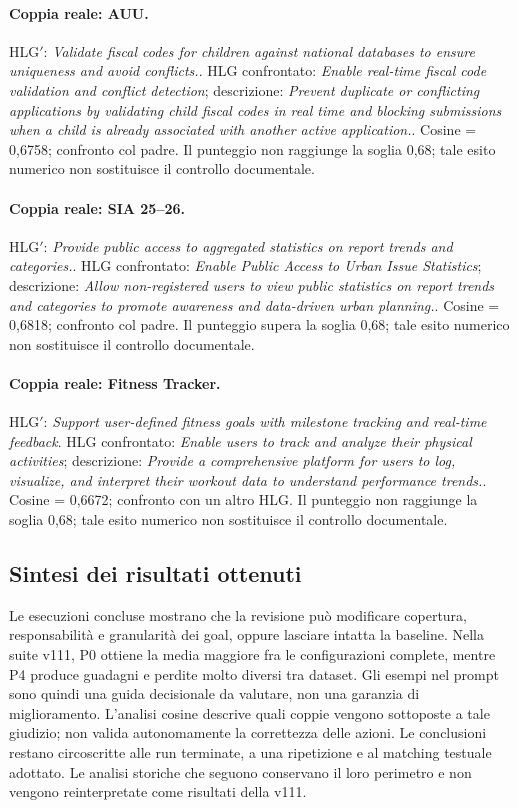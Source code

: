 \paragraph{Coppia reale: AUU.}
HLG$'$: \emph{Validate fiscal codes for children against national databases to ensure uniqueness and avoid conflicts.}. HLG confrontato: \emph{Enable real-time fiscal code validation and conflict detection}; descrizione: \emph{Prevent duplicate or conflicting applications by validating child fiscal codes in real time and blocking submissions when a child is already associated with another active application.}. Cosine = 0,6758; confronto col padre. Il punteggio non raggiunge la soglia 0,68; tale esito numerico non sostituisce il controllo documentale.
\paragraph{Coppia reale: SIA 25--26.}
HLG$'$: \emph{Provide public access to aggregated statistics on report trends and categories.}. HLG confrontato: \emph{Enable Public Access to Urban Issue Statistics}; descrizione: \emph{Allow non-registered users to view public statistics on report trends and categories to promote awareness and data-driven urban planning.}. Cosine = 0,6818; confronto col padre. Il punteggio supera la soglia 0,68; tale esito numerico non sostituisce il controllo documentale.
\paragraph{Coppia reale: Fitness Tracker.}
HLG$'$: \emph{Support user-defined fitness goals with milestone tracking and real-time feedback}. HLG confrontato: \emph{Enable users to track and analyze their physical activities}; descrizione: \emph{Provide a comprehensive platform for users to log, visualize, and interpret their workout data to understand performance trends.}. Cosine = 0,6672; confronto con un altro HLG. Il punteggio non raggiunge la soglia 0,68; tale esito numerico non sostituisce il controllo documentale.
\subsection{Sintesi dei risultati ottenuti}
Le esecuzioni concluse mostrano che la revisione pu\`o modificare
copertura, responsabilit\`a e granularit\`a dei goal, oppure lasciare
intatta la baseline. Nella suite v111, P0 ottiene la media maggiore
fra le configurazioni complete, mentre P4 produce guadagni e perdite
molto diversi tra dataset. Gli esempi nel prompt sono quindi una guida
decisionale da valutare, non una garanzia di miglioramento.
L'analisi cosine descrive quali coppie vengono sottoposte a tale giudizio;
non valida autonomamente la correttezza delle azioni. Le conclusioni
restano circoscritte alle run terminate, a una ripetizione e al matching
testuale adottato. Le analisi storiche che seguono conservano il loro
perimetro e non vengono reinterpretate come risultati della v111.
